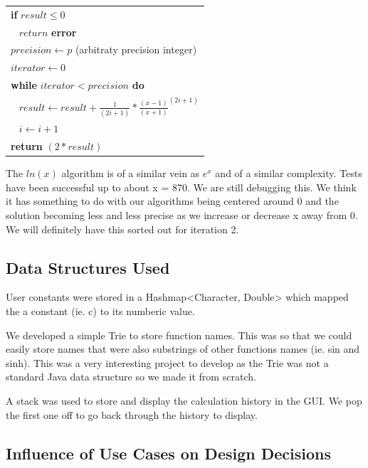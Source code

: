 \documentclass[a4paper, 12pt]{article}
\begin{document}
\begin{center}
\begin{tabular}{l}
{\textbf{if}} $result\leq 0$ \\
$\;\;\; return$ {\textbf{error}} \medskip \\ 

$precision\leftarrow p$ (arbitraty precision integer) \\

\medskip
$iterator\leftarrow 0$ \\

\textbf{while} $iterator < precision$ \textbf{do} \\

$\;\;\;result\leftarrow result + \frac{1}{(2i+1)} * \frac{(x-1)}{(x+1)}^{(2i+1)}$ \\

\medskip
$\;\;\;i\leftarrow i + 1$ \\

\textbf{return} $(2*result)$

\end{tabular}
\end{center}

The $ln(x)$ algorithm is of a similar vein as $e^x$ and of a similar complexity. Tests have been successful up to about x = 870. We are still debugging this. We think it has something to do with our algorithms being centered around 0 and the solution becoming less and less precise as we increase or decrease x away from 0. We will definitely have this sorted out for iteration 2.

\subsection{Data Structures Used}

User constants were stored in a Hashmap<Character, Double> which mapped the a constant (ie. c) to its numberic value.

We developed a simple Trie to store function names. This was so that we could easily store names that were also substrings of other functions names (ie. sin and sinh). This was a very interesting project to develop as the Trie was not a standard Java data structure so we made it from scratch.

A stack was used to store and display the calculation history in the GUI. We pop the first one off to go back through the history to display.

\subsection{Influence of Use Cases on Design Decisions}
\end{document}
